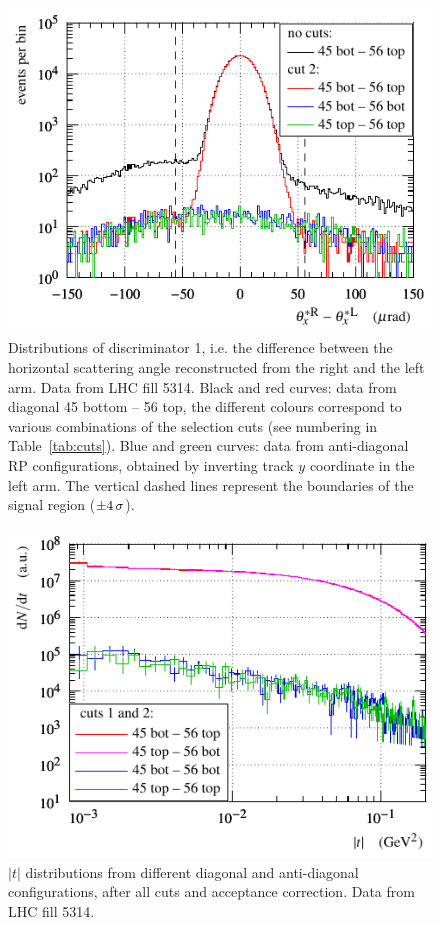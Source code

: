 \begin{figure}
\begin{center}
\includegraphics{fig/cut_dist_antidgn_cmp.pdf}
\caption{%
Distributions of discriminator 1, i.e. the difference between the horizontal scattering angle reconstructed from the right and the left arm. Data from LHC fill 5314. Black and red curves: data from diagonal 45 bottom -- 56 top, the different colours correspond to various combinations of the selection cuts (see numbering in Table~\ref{tab:cuts}). Blue and green curves: data from anti-diagonal RP configurations, obtained by inverting track $y$ coordinate in the left arm. The vertical dashed lines represent the boundaries of the signal region ($\pm 4\,{\rm \sigma}$).
}
\label{fig:tag bckg integ}
\end{center}
\end{figure}


\begin{figure}
\begin{center}
\includegraphics{fig/t_dist_antidgn_cmp.pdf}
\caption{%
$|t|$ distributions from different diagonal and anti-diagonal configurations, after all cuts and acceptance correction. Data from LHC fill 5314.
}
\label{fig:tag bckg dist}
\end{center}
\end{figure}

